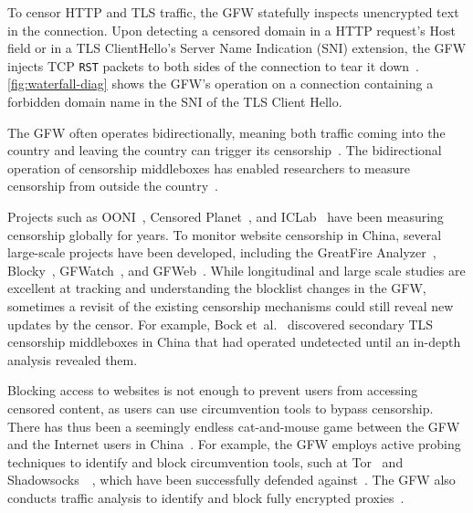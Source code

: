 \documentclass[conference,compsoc]{IEEEtran}
\begin{document}
To censor HTTP and TLS traffic,
the GFW statefully inspects unencrypted text in the connection.
Upon detecting a censored domain in
a HTTP request's Host field or in a TLS ClientHello's Server Name Indication (SNI) extension,
the GFW injects TCP \texttt{RST}
packets to both sides of the connection to tear it down~\cite{tang2016depth,Wang2017a,Bock2021b,Hoang2024a,Clayton2006a}.
\autoref{fig:waterfall-diag} shows the GFW's operation on a connection
containing a forbidden domain name in the SNI of the TLS Client Hello.

The GFW often operates bidirectionally,
meaning both traffic coming into the country and leaving the country
can trigger its censorship~\cite{Sparks2012a,Anonymous2020a,Hoang2024a}.
The bidirectional operation of censorship middleboxes
has enabled researchers to
measure censorship from outside the country~\cite{Marczak2015a, Pearce2017b, Hoang2021a}.


Projects such as OONI~\cite{Filasto2012a},
Censored Planet~\cite{Raman2020c},
and ICLab~\cite{Niaki2020a} have been measuring censorship globally for years.
To monitor website censorship in China,
several large-scale projects have been developed,
including the GreatFire Analyzer~\cite{greatfire_analyzer},
Blocky~\cite{greatfire_blocky},
GFWatch~\cite{Hoang2021a},
and GFWeb~\cite{Hoang2024a}.
While longitudinal and large scale studies are excellent at tracking and understanding
the blocklist changes in the GFW,
sometimes a revisit of the existing censorship mechanisms could still reveal new updates by the censor.
For example,
Bock et~al.~\cite{Bock2021c} discovered secondary TLS censorship middleboxes in China
that had operated undetected until an in-depth analysis revealed them.


Blocking access to websites is not enough to prevent users from accessing
censored content,
as users can use circumvention tools to bypass censorship.
There has thus been a seemingly endless cat-and-mouse game between the GFW and the Internet users in China~\cite{cat-and-mouse}.
For example,
the GFW employs active probing techniques to identify
and block circumvention tools,
such at Tor~\cite{Winter-obfs2-probe,Winter2012a,knock-knock-tor,Ensafi2015b,Dunna2018a}
and Shadowsocks~\cite{Alice2020a}~\cite[\S 5]{Wu2023a},
which have been successfully defended against~\cite{Anonymous2021ShadowsocksAdvise,Anonymous2021ShadowsocksTutorial,Frolov2020a,Frolov2020b}.
The GFW also conducts traffic analysis to identify and block fully encrypted proxies~\cite{Wu2023a}.
\end{document}
